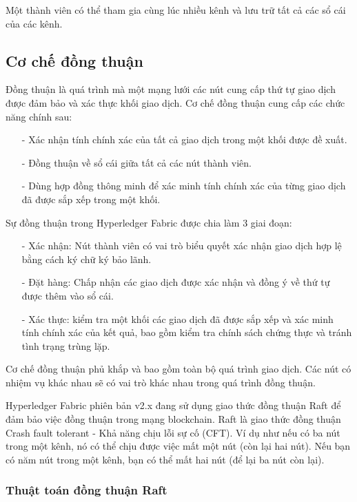 Một thành viên có thể tham gia cùng lúc nhiều kênh và lưu trữ tất cả các sổ cái của các kênh.

\subsection{Cơ chế đồng thuận}

Đồng thuận là quá trình mà một mạng lưới các nút cung cấp thứ tự giao dịch được đảm 
bảo và xác thực khối giao dịch. Cơ chế đồng thuận cung cấp các chức năng chính sau: 

\begin{itemize}
    \item[-] Xác nhận tính chính xác của tất cả giao dịch trong một khối được đề xuất.
    \item[-] Đồng thuận về sổ cái giữa tất cả các nút thành viên.
    \item[-] Dùng hợp đồng thông minh để xác minh tính chính xác của từng giao dịch đã được sắp xếp trong một khối.
\end{itemize} 

Sự đồng thuận trong Hyperledger Fabric được chia làm 3 giai đoạn:

\begin{itemize}
    \item[-] Xác nhận: Nút thành viên có vai trò biểu quyết xác nhận giao dịch hợp lệ bằng cách ký chữ ký bảo lãnh.
    \item[-] Đặt hàng: Chấp nhận các giao dịch được xác nhận và đồng ý về thứ tự được thêm vào sổ cái.
    \item[-] Xác thực: kiểm tra một khối các giao dịch đã được sắp xếp và xác minh tính chính xác của kết quả, 
    bao gồm kiểm tra chính sách chứng thực và tránh tình trạng trùng lặp. \cite{consensus}
\end{itemize}

Cơ chế đồng thuận phủ khắp và bao gồm toàn bộ quá trình giao dịch. Các nút 
có nhiệm vụ khác nhau sẽ có vai trò khác nhau trong quá trình đồng thuận.

Hyperledger Fabric phiên bản v2.x đang sử dụng giao thức đồng thuận Raft để đảm bảo việc đồng thuận trong 
mạng blockchain. Raft là giao thức đồng thuận Crash fault tolerant - Khả năng chịu lỗi sự cố (CFT). 
Ví dụ như nếu có ba nút trong một kênh, nó có thể chịu được việc mất một nút (còn lại hai nút). 
Nếu bạn có năm nút trong một kênh, bạn có thể mất hai nút (để lại ba nút còn lại). 

\subsubsection{Thuật toán đồng thuận Raft}

